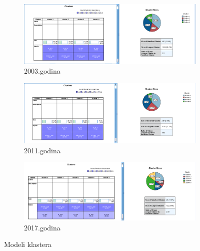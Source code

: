 \documentclass[a4paper]{article}
\begin{document}
\begin{figure}[H]
	\begin{subfigure}[h]{\textwidth}
		\begin{center}
			\includegraphics[scale=0.50]{Klasterovanje/Model_KMeans2003.png}
		\end{center}
		\caption{2003.godina}
		\label{fig:SPSS_Model2003}
	\end{subfigure}
	
	\vspace{1cm}
	\begin{subfigure}[h]{\textwidth}
		\begin{center}
			\includegraphics[scale=0.50]{Klasterovanje/Model_KMeans2011.png}
		\end{center}
		\caption{2011.godina}
		\label{fig:SPSS_Model2011}
	\end{subfigure}
	
	\vspace{1cm}
	\begin{subfigure}[h]{\textwidth}
		\begin{center}
			\includegraphics[scale=0.50]{Klasterovanje/Model_KMeans2017.png}
		\end{center}
		\caption{2017.godina}
		\label{fig:SPSS_Model2017}
	\end{subfigure}
	
	\caption{Modeli klastera}
	\label{ModeliKlastera}
\end{figure}
\end{document}
